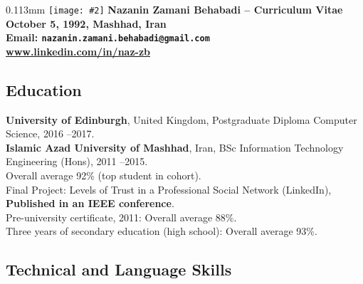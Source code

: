 \documentclass[10pt]{article}
\newcommand{\imagetext}[3][0.11]{%
\begin{imagetextbox}[]{#1\textwidth}{3mm}%
  \texttt{[image: \#2]}%
  \tcblower%
   #3%
\end{imagetextbox}}
\begin{document}
\imagetext{1.jpg}{\Large\bf Nazanin Zamani Behabadi -- \textcolor{ green!50!red}{Curriculum Vitae} \\ \normalsize October 5, 1992, Mashhad, Iran \\ \normalsize Email: \texttt{nazanin.zamani.behabadi@gmail.com}\\ \href{https://www.linkedin.com/in/nazanin-zamani-behabadi-a2511398/}{\underline{www.linkedin.com/in/naz-zb}}}
\thispagestyle{empty}

\subsection*{Education}
\noindent \textbf{University of Edinburgh}, United Kingdom, Postgraduate Diploma Computer Science, 2016 --2017.\vspace{1mm}\\
\noindent \textbf{Islamic Azad University of Mashhad}, Iran, BSc Information Technology Engineering (Hons), 2011 --2015. \\
\indent Overall average 92\%  (top student in cohort).\\
\indent Final Project: Levels of Trust in a Professional Social Network (LinkedIn), \textbf {Published in an IEEE conference}.\vspace{1mm}\\
\noindent Pre-university certificate, 2011: Overall average  88\%. \\
\noindent Three years of secondary education (high school): Overall average  93\%.

\subsection*{Technical and Language Skills}
\end{document}
